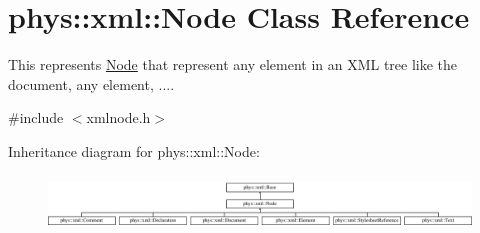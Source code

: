 \hypertarget{classphys_1_1xml_1_1Node}{
\section{phys::xml::Node Class Reference}
\label{d7/d0a/classphys_1_1xml_1_1Node}
}


This represents \hyperlink{classphys_1_1xml_1_1Node}{Node} that represent any element in an XML tree like the document, any element, ....  




{\ttfamily \#include $<$xmlnode.h$>$}

Inheritance diagram for phys::xml::Node:\begin{figure}[H]
\begin{center}
\leavevmode
\includegraphics[height=1.443299cm]{d7/d0a/classphys_1_1xml_1_1Node}
\end{center}
\end{figure}
